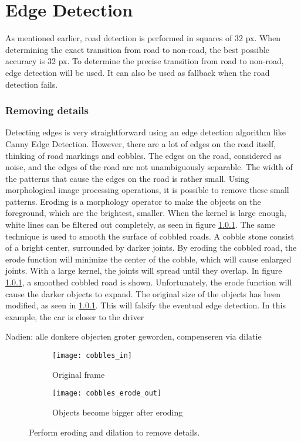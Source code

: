 \chapter{Edge Detection}

As mentioned earlier, road detection is performed in squares of 32 px. When determining the exact transition from road to non-road, the best possible accuracy is 32 px. To determine the precise transition from road to non-road, edge detection will be used. It can also be used as fallback when the road detection fails.
\npar 
\subsection{Removing details}

Detecting edges is very straightforward using an edge detection algorithm like Canny Edge Detection. However, there are a lot of edges on the road itself, thinking of road markings and cobbles. The edges on the road, considered as noise, and the edges of the road are not unambiguously separable. The width of the patterns that cause the edges on the road is rather small. Using morphological image processing operations, it is possible to remove these small patterns.  
\npar
Eroding is a morphology operator to make the objects on the foreground, which are the brightest, smaller. When the kernel is large enough, white lines can be filtered out completely, as seen in figure \ref{}. The same technique is used to smooth the surface of cobbled roads. A cobble stone consist of a bright center, surrounded by darker joints. By eroding the cobbled road, the erode function will minimize the center of the cobble, which will cause enlarged joints. With a large kernel, the joints will spread until they overlap. In figure \ref{}, a smoothed cobbled road is shown.
\npar
Unfortunately, the erode function will cause the darker objects to expand. The original size of the objects has been modified, as seen in \ref{}. This will falsify the eventual edge detection. In this example, the car is closer to the driver 


Nadien: alle donkere objecten groter geworden, compenseren via dilatie

\begin{figure}[ht]
\centering
\begin{subfigure}{.5\textwidth}
  \centering
  \texttt{[image: cobbles\_in]}
  \caption{Original frame\label{zebra_orig}}
\end{subfigure}%
\begin{subfigure}{.5\textwidth}
  \centering
  \texttt{[image: cobbles\_erode\_out]}
  \caption{Objects become bigger after eroding\label{zebrawitcanny}}
\end{subfigure}
\caption{Perform eroding and dilation to remove details.}
\end{figure}


